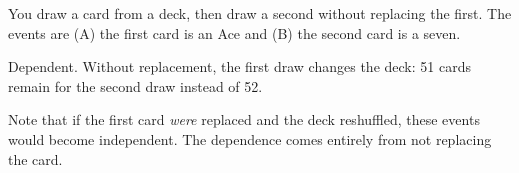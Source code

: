 \documentclass[12pt]{ximera}
\begin{document}
\begin{problem}
You draw a card from a deck, then draw a second without replacing the first. The events
are (A) the first card is an Ace and (B) the second card is a seven.
\begin{multipleChoice}
\end{multipleChoice}

\begin{solution}
Dependent. Without replacement, the first draw changes the deck: 51 cards remain for the
second draw instead of 52.

Note that if the first card \emph{were} replaced and the deck reshuffled, these events
would become independent. The dependence comes entirely from not replacing the card.
\end{solution}
\end{problem}
\end{document}
